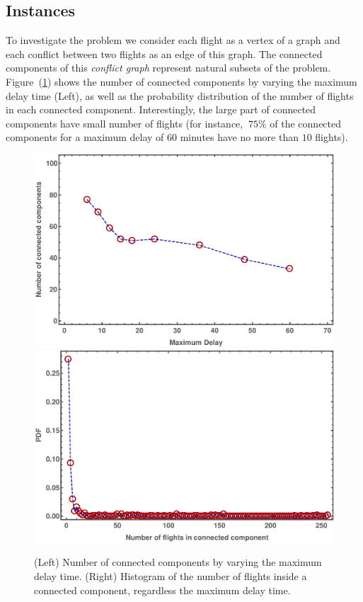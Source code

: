 \subsection{Instances}\label{sec:instances}
To investigate the problem we consider each flight as a vertex of a graph and
each conflict between two flights as an edge of this graph.  The connected
components of this \emph{conflict graph} represent natural subsets of the
problem. Figure~(\ref{fig:hist_cc}) shows the number of connected components by
varying the maximum delay time (Left), as well as the probability distribution
of the number of flights in each connected component. Interestingly, the large
part of connected components have small number of flights (for instance, $~75\%$
of the connected components for a maximum delay of $60$ minutes have no more
than $10$ flights). 

\begin{figure}[t!]
  \includegraphics[width=\columnwidth]{pics/instances/num_cc.pdf}
  \includegraphics[width=\columnwidth]{pics/instances/analysis_cc.pdf}
  \caption{\label{fig:hist_cc}(Left) Number of connected components by varying
  the maximum delay time. (Right) Histogram of the number of flights inside a
  connected component, regardless the maximum delay time.}
\end{figure}

